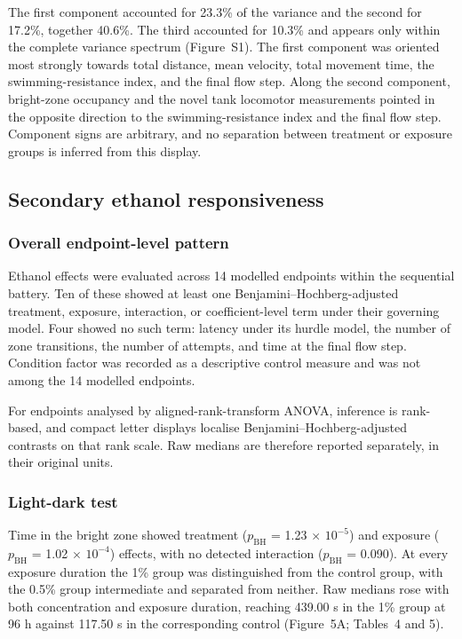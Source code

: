 \documentclass[12pt,a4paper]{article}
\begin{document}
The first component accounted for 23.3\% of the variance and the second for 17.2\%, together 40.6\%. The third accounted for 10.3\% and appears only within the complete variance spectrum (Figure~S1). The first component was oriented most strongly towards total distance, mean velocity, total movement time, the swimming-resistance index, and the final flow step. Along the second component, bright-zone occupancy and the novel tank locomotor measurements pointed in the opposite direction to the swimming-resistance index and the final flow step. Component signs are arbitrary, and no separation between treatment or exposure groups is inferred from this display.

\subsection{Secondary ethanol responsiveness}
\label{sec-ethanol}

\subsubsection{Overall endpoint-level pattern}
\label{sec-3-4-1}

Ethanol effects were evaluated across 14 modelled endpoints within the sequential battery. Ten of these showed at least one Benjamini--Hochberg-adjusted treatment, exposure, interaction, or coefficient-level term under their governing model. Four showed no such term: latency under its hurdle model, the number of zone transitions, the number of attempts, and time at the final flow step. Condition factor was recorded as a descriptive control measure and was not among the 14 modelled endpoints.

For endpoints analysed by aligned-rank-transform ANOVA, inference is rank-based, and compact letter displays localise Benjamini--Hochberg-adjusted contrasts on that rank scale. Raw medians are therefore reported separately, in their original units.

\subsubsection{Light-dark test}
\label{sec-3-4-2}

Time in the bright zone showed treatment ($p_{\mathrm{BH}}$ = 1.23 $\times$ $10^{-5}$) and exposure ($p_{\mathrm{BH}}$ = 1.02 $\times$ $10^{-4}$) effects, with no detected interaction ($p_{\mathrm{BH}}$ = 0.090). At every exposure duration the 1\% group was distinguished from the control group, with the 0.5\% group intermediate and separated from neither. Raw medians rose with both concentration and exposure duration, reaching 439.00 s in the 1\% group at 96 h against 117.50 s in the corresponding control (Figure~5A; Tables~4 and 5).
\end{document}
